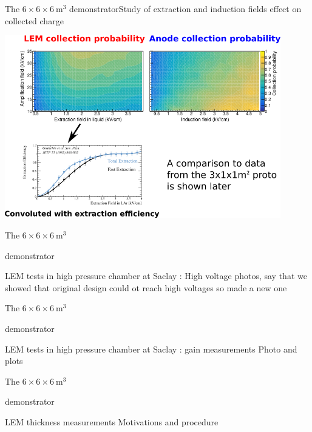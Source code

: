 \documentclass[10pt]{beamer}
\begin{document}
    \begin{frame}{The \texorpdfstring{$6 \times 6 \times \SI{6}{\meter\cubed}$}{666} demonstrator}{Study of extraction and induction fields effect on collected charge}
    	\begin{scriptsize}
    		\includegraphics[width=0.9\textwidth]{figures/666/effs.png}\\
    	\end{scriptsize} 
    \end{frame}
    
    \begin{frame}{The \texorpdfstring{$6 \times 6 \times \SI{6}{\meter\cubed}$}{666}
    		\begin{scriptsize}
    		\end{scriptsize} demonstrator}{LEM tests in high pressure chamber at Saclay : High voltage}
    	photos, say that we showed that original design could ot reach high voltages so made a new one
    \end{frame}
    
    \begin{frame}{The \texorpdfstring{$6 \times 6 \times \SI{6}{\meter\cubed}$}{666}
    		\begin{scriptsize}
    		\end{scriptsize} demonstrator}{LEM tests in high pressure chamber at Saclay : gain measurements}
    	Photo and plots
    \end{frame}
    
    \begin{frame}{The \texorpdfstring{$6 \times 6 \times \SI{6}{\meter\cubed}$}{666}
    		\begin{scriptsize}
    		\end{scriptsize} demonstrator}{LEM thickness measurements}
    	Motivations and procedure
    \end{frame}
    
\end{document}

